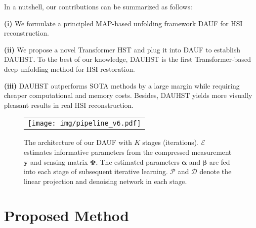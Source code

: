 \documentclass{article}
\begin{document}
In a nutshell, our contributions can be summarized as follows:

\textbf{(i)} We formulate a principled MAP-based  unfolding framework DAUF for HSI reconstruction. 

\textbf{(ii)} We propose a novel Transformer HST and plug it into DAUF to establish DAUHST. To the best of our knowledge, DAUHST is the first Transformer-based deep unfolding method for HSI restoration. 

\textbf{(iii)} DAUHST outperforms SOTA methods by a large margin  while requiring cheaper computational and memory costs. Besides, DAUHST yields more visually pleasant results in real HSI reconstruction. 



\begin{figure*}[t]
	\begin{center}
		\begin{tabular}[t]{c} \hspace{-2.4mm}
			\texttt{[image: img/pipeline\_v6.pdf]}
		\end{tabular}
	\end{center}
	\vspace*{-3mm}
	\caption{\small The architecture of our DAUF with $K$ stages (iterations). $\mathcal{E}$ estimates informative parameters from the compressed  measurement $\mathbf{y}$ and sensing matrix $\mathbf{\Phi}$. The estimated parameters $\boldsymbol{\alpha}$ and $\boldsymbol{\beta}$ are fed into each stage of subsequent iterative learning.  $\mathcal{P}$ and $\mathcal{D}$ denote the linear projection and denoising network in each stage.}
	\label{fig:pipeline}
	\vspace{-3mm}
\end{figure*}

\vspace{-3mm}
\section{Proposed Method} \label{sec:method}
\vspace{-2mm}
\end{document}
